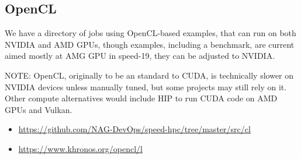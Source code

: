 \subsection{OpenCL}
\label{sect:cl}

We have a directory of jobs using OpenCL-based examples, that can
run on both NVIDIA and AMD GPUs, though examples, including a
benchmark, are current aimed mostly at AMG GPU in speed-19, they can
be adjusted to NVIDIA.

NOTE: OpenCL, originally to be an standard to CUDA,
is technically slower on NVIDIA devices unless manually tuned,
but some projects may still rely on it. Other compute alternatives
would include HIP to run CUDA code on AMD GPUs and Vulkan.

\begin{itemize}
  \item \url{https://github.com/NAG-DevOps/speed-hpc/tree/master/src/cl}
  \item \url{https://www.khronos.org/opencl/l}
\end{itemize}

